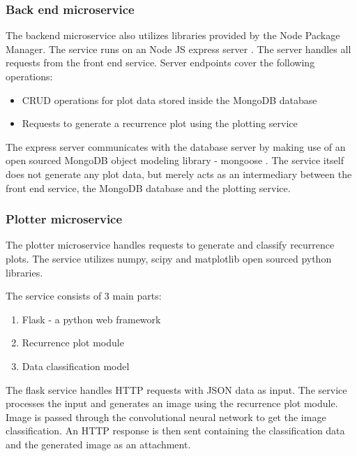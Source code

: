 \documentclass[a4paper,12pt,fleqn]{article}
\begin{document}
\subsubsection{Back end microservice}
The backend microservice also utilizes libraries provided by the Node Package Manager.
The service runs on an Node JS express server \cite{express}.
The server handles all requests from the front end service.
Server endpoints cover the following operations:
\begin{itemize}
  \item CRUD operations for plot data stored inside the MongoDB database
  \item Requests to generate a recurrence plot using the plotting service
\end{itemize}
The express server communicates with the database server by making use of an open sourced MongoDB object modeling library - mongoose \cite{mongoose}.
The service itself does not generate any plot data, but merely acts as an intermediary between the front end service, the MongoDB database and the plotting service.


\subsubsection{Plotter microservice}
\label{sec:plotter_microservice}
The plotter microservice handles requests to generate and classify recurrence plots.
The service utilizes numpy\cite{numpy}, scipy\cite{scipy} and matplotlib\cite{matplotlib} open sourced python libraries.

The service consists of 3 main parts:
\begin{enumerate}
  \item Flask - a python web framework
  \item Recurrence plot module
  \item Data classification model
\end{enumerate}
The flask service handles HTTP requests with JSON data as input.
The service processes the input and generates an image using the recurrence plot module.
Image is passed through the convolutional neural network to get the image classification.
An HTTP response is then sent containing the classification data and the generated image as an attachment.


\end{document}

